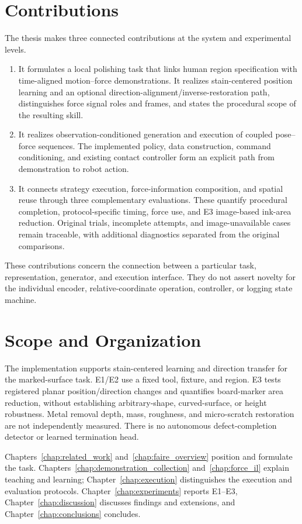 \section{Contributions}
The thesis makes three connected contributions at the system and experimental levels.
\begin{enumerate}[leftmargin=0.8cm]
\item It formulates a local polishing task that links human region specification with time-aligned motion--force demonstrations. It realizes stain-centered position learning and an optional direction-alignment/inverse-restoration path, distinguishes force signal roles and frames, and states the procedural scope of the resulting skill.
\item It realizes observation-conditioned generation and execution of coupled pose--force sequences. The implemented policy, data construction, command conditioning, and existing contact controller form an explicit path from demonstration to robot action.
\item It connects strategy execution, force-information composition, and spatial reuse through three complementary evaluations. These quantify procedural completion, protocol-specific timing, force use, and E3 image-based ink-area reduction. Original trials, incomplete attempts, and image-unavailable cases remain traceable, with additional diagnostics separated from the original comparisons.
\end{enumerate}
These contributions concern the connection between a particular task, representation, generator, and execution interface. They do not assert novelty for the individual encoder, relative-coordinate operation, controller, or logging state machine.

\section{Scope and Organization}
The implementation supports stain-centered learning and direction transfer for the marked-surface task. E1/E2 use a fixed tool, fixture, and region. E3 tests registered planar position/direction changes and quantifies board-marker area reduction, without establishing arbitrary-shape, curved-surface, or height robustness. Metal removal depth, mass, roughness, and micro-scratch restoration are not independently measured. There is no autonomous defect-completion detector or learned termination head.

Chapters~\ref{chap:related_work} and~\ref{chap:faire_overview} position and formulate the task. Chapters~\ref{chap:demonstration_collection} and~\ref{chap:force_il} explain teaching and learning; Chapter~\ref{chap:execution} distinguishes the execution and evaluation protocols. Chapter~\ref{chap:experiments} reports E1--E3, Chapter~\ref{chap:discussion} discusses findings and extensions, and Chapter~\ref{chap:conclusions} concludes.
